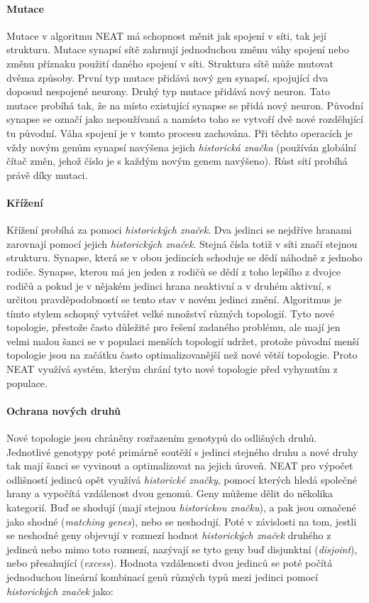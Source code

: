 \paragraph{Mutace}
Mutace v algoritmu NEAT má schopnost měnit jak spojení v síti, tak její
strukturu. Mutace synapsí sítě zahrnují jednoduchou změnu váhy spojení nebo
změnu příznaku použití daného spojení v síti. Struktura sítě může mutovat
dvěma způsoby. První typ mutace přidává nový gen synapsí, spojující dva doposud
nespojené neurony. Druhý typ mutace přidává nový neuron. Tato mutace probíhá
tak, že na místo existující synapse se přidá nový neuron. Původní synapse se
označí jako nepoužívaná a namísto toho se vytvoří dvě nové rozdělující tu
původní. Váha spojení je v tomto procesu zachována. Při těchto operacích je
vždy novým genům synapsí navýšena jejich \emph{historická značka} (používán
globální čítač změn, jehož číslo je s každým novým genem navýšeno). Růst
sítí probíhá právě díky mutaci.

\paragraph{Křížení}
Křížení probíhá za pomoci \emph{historických značek}. Dva jedinci se nejdříve
hranami zarovnají pomocí jejich \emph{historických značek}. Stejná čísla totiž v
síti značí stejnou strukturu. Synapse, která se v obou jedincích schoduje se
dědí náhodně z jednoho rodiče. Synapse, kterou má jen jeden z rodičů se dědí z
toho lepšího z dvojce rodičů a pokud je v nějakém jedinci hrana neaktivní a v
druhém aktivní, s určitou pravděpodobností se tento stav v novém jedinci změní.
Algoritmus je tímto stylem schopný vytvářet velké množství různých topologií.
Tyto nové topologie, přestože často důležité pro řešení zadaného problému, ale
mají jen velmi malou šanci se v populaci menších topologií udržet, protože
původní menší topologie jsou na začátku často optimalizovanější než nové větší
topologie. Proto NEAT využívá systém, kterým chrání tyto nové topologie před
vyhynutím z populace.

\paragraph{Ochrana nových druhů}
Nové topologie jsou chráněny rozřazením genotypů do odlišných druhů. Jednotlivé
genotypy poté primárně soutěží s jedinci stejného druhu a nové druhy tak mají
šanci se vyvinout a optimalizovat na jejich úroveň. NEAT pro výpočet odlišností
jedinců opět využívá \emph{historické značky}, pomocí kterých hledá společné
hrany a vypočítá vzdálenost dvou genomů. Geny můžeme dělit do několika
kategorií. Buď se shodují (mají stejnou \emph{historickou značku}), a pak jsou
označené jako shodné (\emph{matching genes}), nebo se neshodují. Poté v
závislosti na tom, jestli se neshodné geny objevují v rozmezí hodnot
\emph{historických značek} druhého z jedinců nebo mimo toto rozmezí, nazývají se
tyto geny buď disjunktní (\emph{disjoint}), nebo přesahující (\emph{excess}).
Hodnota vzdálenosti dvou jedinců se poté počítá jednoduchou lineární kombinací
genů různých typů mezi jedinci pomocí \emph{historických značek} jako:

